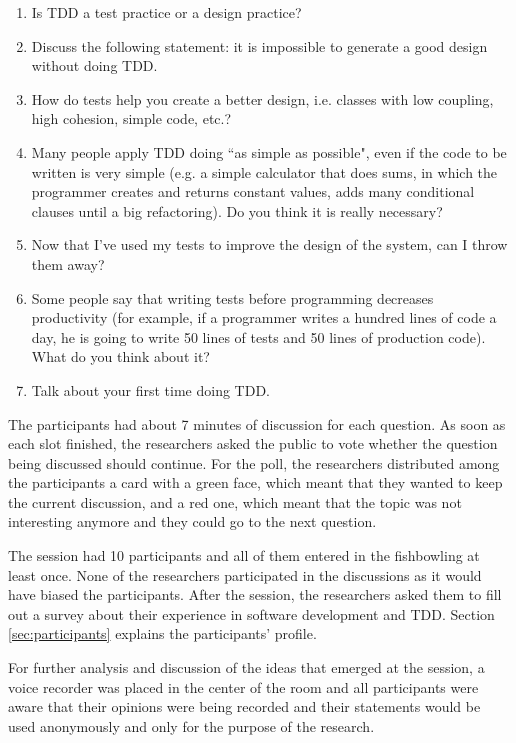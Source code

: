 \begin{enumerate}
\item Is TDD a test practice or a design practice?
\item Discuss the following statement: it is impossible to generate a good
design without doing TDD.
\item How do tests help you create a better design, i.e. classes with low 
coupling, high cohesion, simple code, etc.?
\item Many people apply TDD doing ``as simple as possible", even if the code to
be written is very simple (e.g. a simple calculator that does sums, in which the
programmer creates and returns constant values, adds many conditional clauses
until a big refactoring). Do you think it is really necessary?
\item Now that I've used my tests to improve the design of the system, 
can I throw them away?
\item Some people say that writing tests before programming decreases
productivity (for example, if a programmer writes a hundred lines of code a
day, he is going to write 50 lines of tests and 50 lines of production code).
What do you think about it?
\item Talk about your first time doing TDD.
\label{questions}
\end{enumerate}

The participants had about 7 minutes of discussion for each question.
As soon as each slot finished, the researchers asked the public to vote whether
the question being discussed should continue.
For the poll, the researchers distributed among the participants a card with a
green face, which meant that they wanted to keep the
current discussion, and a red one, which meant that the topic was not
interesting anymore and they could go to the next question.

The session had 10 participants and all of them entered in the fishbowling at
least once.
None of the researchers participated in the discussions as it would have biased
the participants.
After the session, the researchers asked them to fill out a survey about their
experience in software development and TDD. Section \ref{sec:participants}
explains the participants' profile.

For further analysis and discussion of the ideas that emerged at the session, a
voice recorder was placed in the center of the room and all participants were
aware that their opinions were being recorded and their statements would be
used anonymously and only for the purpose of the research.

